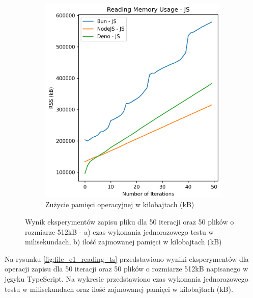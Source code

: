 \begin{figure}[H]
  \begin{subfigure}[b]{0.4\textwidth}
    \centering
    \includegraphics[width=\textwidth]{Figures/files/files_writing_50_500_50_js_memory.png}
    \caption{Zużycie pamięci operacyjnej w kilobajtach (kB)}
    \label{fig:file_e1_writing_js_memory}
  \end{subfigure}
  \caption{Wynik eksperymentów zapisu pliku dla 50 iteracji oraz 50 plików o rozmiarze 512kB - a) czas wykonania jednorazowego testu w milisekundach, b) ilość zajmowanej pamięci w kilobajtach (kB)}
  \label{fig:file_e1_writing_js}
\end{figure}

Na rysunku \ref{fig:file_e1_reading_ts} przedstawiono wyniki eksperymentów dla operacji zapisu dla 50 iteracji oraz 50 plików o rozmiarze 512kB napisanego w języku TypeScript. Na wykresie przedstawiono czas wykonania jednorazowego testu w milisekundach oraz ilość zajmowanej pamięci w kilobajtach (kB).

